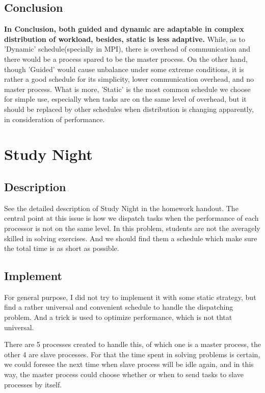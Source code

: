 \documentclass[a4paper]{article}   %
\begin{document}
\begin{CJK}{UTF8}{gbsn}
\begin{spacing}{1.2}
\subsection{Conclusion}
\textbf{In Conclusion, both guided and dynamic are adaptable in complex distribution of workload, besides, static is less adaptive. } While, as to 'Dynamic' schedule(specially in MPI), there is overhead of communication and there would be a process spared to be the master process. On the other hand, though 'Guided' would cause unbalance under some extreme conditions, it is rather a good schedule for its simplicity, lower communication overhead, and no master process. What is more, 'Static' is the most common schedule we choose for simple use, especially when tasks are on the same level of overhead, but it should be replaced by other schedules when distribution is changing apparently, in consideration of performance. 

\section{Study Night}
\subsection{Description}
See the detailed description of Study Night in the homework handout. The central point at this issue is how we dispatch tasks when the performance of each processor is not on the same level. In this problem, students are not the averagely skilled in solving exercises. And we should find them a schedule which make sure the total time is as short as possible. 

\subsection{Implement}
For general purpose, I did not try to implement it with some static strategy, but find a rather universal and convenient schedule to handle the dispatching problem. And a trick is used to optimize performance, which is not thtat universal. 

There are 5 processes created to handle this, of which one is a master process, the other 4 are slave processes. For that the time spent in solving problems is certain, we could foresee the next time when slave process will be idle again, and in this way, the master process could choose whether or when to send tasks to slave processes by itself. 


\end{spacing}
\end{CJK}
\end{document}
